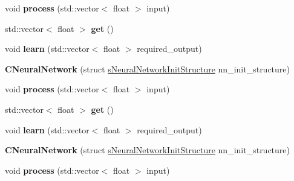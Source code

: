 \begin{DoxyCompactItemize}
\item 
\hypertarget{classCNeuralNetwork_a5296b2830588ff8ca2570f18750536b7}{void {\bfseries process} (std\-::vector$<$ float $>$ input)}\label{classCNeuralNetwork_a5296b2830588ff8ca2570f18750536b7}

\item 
\hypertarget{classCNeuralNetwork_aa9fe23130a9bb3b534a2e96fd07455c3}{std\-::vector$<$ float $>$ {\bfseries get} ()}\label{classCNeuralNetwork_aa9fe23130a9bb3b534a2e96fd07455c3}

\item 
\hypertarget{classCNeuralNetwork_a4926c2b280154a13ea49e3f4d0d26b00}{void {\bfseries learn} (std\-::vector$<$ float $>$ required\-\_\-output)}\label{classCNeuralNetwork_a4926c2b280154a13ea49e3f4d0d26b00}

\item 
\hypertarget{classCNeuralNetwork_af2f5f3147ed5c69c3b648347817dc8d1}{{\bfseries C\-Neural\-Network} (struct \hyperlink{structsNeuralNetworkInitStructure}{s\-Neural\-Network\-Init\-Structure} nn\-\_\-init\-\_\-structure)}\label{classCNeuralNetwork_af2f5f3147ed5c69c3b648347817dc8d1}

\item 
\hypertarget{classCNeuralNetwork_a5296b2830588ff8ca2570f18750536b7}{void {\bfseries process} (std\-::vector$<$ float $>$ input)}\label{classCNeuralNetwork_a5296b2830588ff8ca2570f18750536b7}

\item 
\hypertarget{classCNeuralNetwork_aa9fe23130a9bb3b534a2e96fd07455c3}{std\-::vector$<$ float $>$ {\bfseries get} ()}\label{classCNeuralNetwork_aa9fe23130a9bb3b534a2e96fd07455c3}

\item 
\hypertarget{classCNeuralNetwork_a4926c2b280154a13ea49e3f4d0d26b00}{void {\bfseries learn} (std\-::vector$<$ float $>$ required\-\_\-output)}\label{classCNeuralNetwork_a4926c2b280154a13ea49e3f4d0d26b00}

\item 
\hypertarget{classCNeuralNetwork_af2f5f3147ed5c69c3b648347817dc8d1}{{\bfseries C\-Neural\-Network} (struct \hyperlink{structsNeuralNetworkInitStructure}{s\-Neural\-Network\-Init\-Structure} nn\-\_\-init\-\_\-structure)}\label{classCNeuralNetwork_af2f5f3147ed5c69c3b648347817dc8d1}

\item 
\hypertarget{classCNeuralNetwork_a5296b2830588ff8ca2570f18750536b7}{void {\bfseries process} (std\-::vector$<$ float $>$ input)}\label{classCNeuralNetwork_a5296b2830588ff8ca2570f18750536b7}


\end{DoxyCompactItemize}
